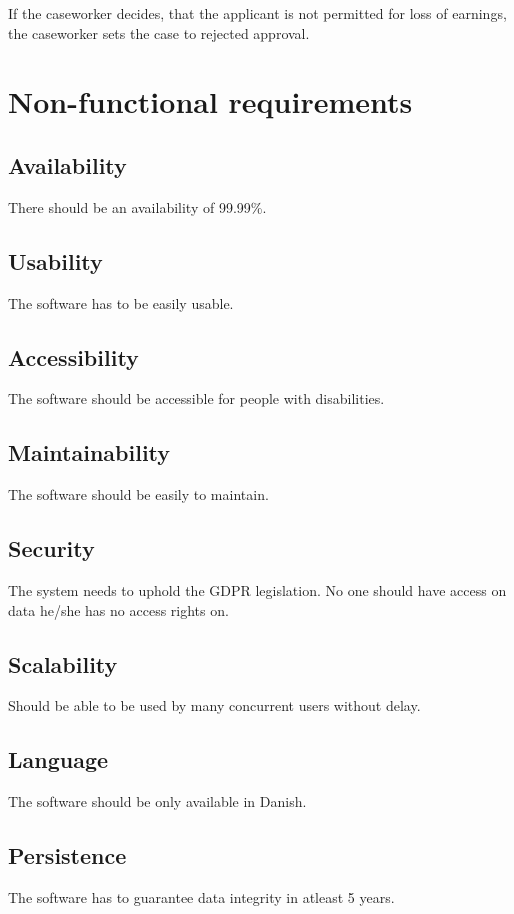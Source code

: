 \documentclass{article}
\begin{document}
If the caseworker decides, that the applicant is not permitted for loss of earnings, the caseworker sets the case to rejected approval. 

\section{Non-functional requirements}

\subsection{Availability}
There should be an availability of 99.99\%.

\subsection{Usability}
The software has to be easily usable.

\subsection{Accessibility}
The software should be accessible for people with disabilities. 

\subsection{Maintainability}
The software should be easily to maintain.

\subsection{Security}
The system needs to uphold the GDPR legislation.
No one should have access on data he/she has no access rights on.

\subsection{Scalability}
Should be able to be used by many concurrent users without delay.

\subsection{Language}
The software should be only available in Danish.

\subsection{Persistence}
The software has to guarantee data integrity in atleast 5 years.
\end{document}
